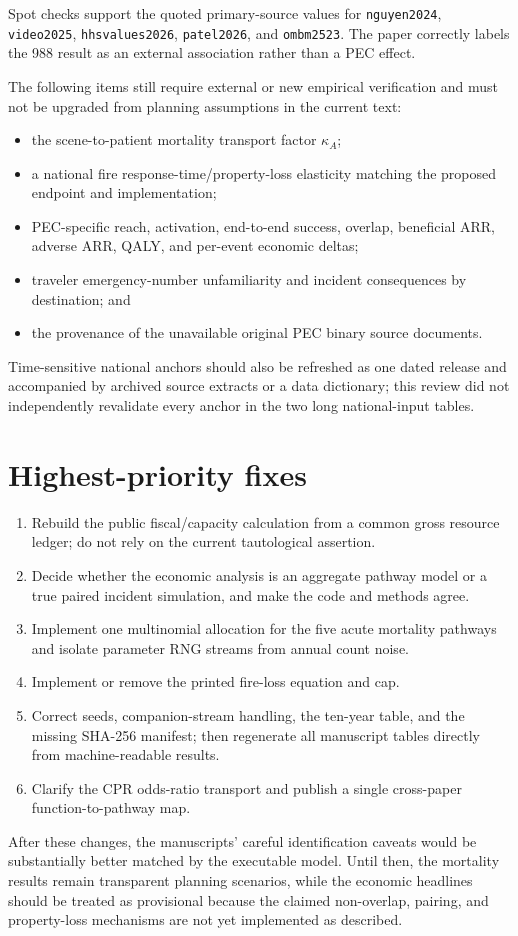 \documentclass[11pt]{article}
\begin{document}
Spot checks support the quoted primary-source values for
\texttt{nguyen2024}, \texttt{video2025}, \texttt{hhsvalues2026},
\texttt{patel2026}, and \texttt{ombm2523}.  The paper correctly labels the
988 result as an external association rather than a PEC effect.

The following items still require external or new empirical verification and
must not be upgraded from planning assumptions in the current text:
\begin{itemize}
\item the scene-to-patient mortality transport factor \(\kappa_A\);
\item a national fire response-time/property-loss elasticity matching the
proposed endpoint and implementation;
\item PEC-specific reach, activation, end-to-end success, overlap, beneficial
ARR, adverse ARR, QALY, and per-event economic deltas;
\item traveler emergency-number unfamiliarity and incident consequences by
destination; and
\item the provenance of the unavailable original PEC binary source documents.
\end{itemize}
Time-sensitive national anchors should also be refreshed as one dated release
and accompanied by archived source extracts or a data dictionary; this review
did not independently revalidate every anchor in the two long national-input
tables.

\section*{Highest-priority fixes}

\begin{enumerate}
\item Rebuild the public fiscal/capacity calculation from a common gross
resource ledger; do not rely on the current tautological assertion.
\item Decide whether the economic analysis is an aggregate pathway model or a
true paired incident simulation, and make the code and methods agree.
\item Implement one multinomial allocation for the five acute mortality
pathways and isolate parameter RNG streams from annual count noise.
\item Implement or remove the printed fire-loss equation and cap.
\item Correct seeds, companion-stream handling, the ten-year table, and the
missing SHA-256 manifest; then regenerate all manuscript tables directly from
machine-readable results.
\item Clarify the CPR odds-ratio transport and publish a single cross-paper
function-to-pathway map.
\end{enumerate}

After these changes, the manuscripts' careful identification caveats would be
substantially better matched by the executable model.  Until then, the
mortality results remain transparent planning scenarios, while the economic
headlines should be treated as provisional because the claimed non-overlap,
pairing, and property-loss mechanisms are not yet implemented as described.
\end{document}
